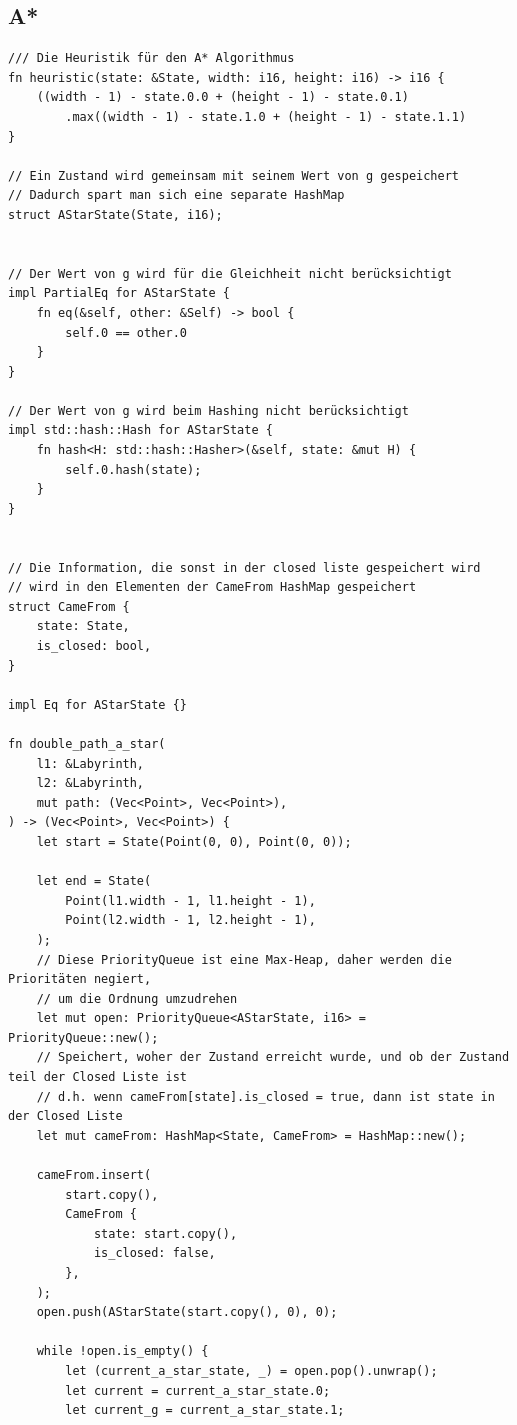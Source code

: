 \documentclass[a4paper,10pt,ngerman]{scrartcl}
\begin{document}
    \subsection{A*}
    \begin{verbatim}
/// Die Heuristik für den A* Algorithmus
fn heuristic(state: &State, width: i16, height: i16) -> i16 {
    ((width - 1) - state.0.0 + (height - 1) - state.0.1)
        .max((width - 1) - state.1.0 + (height - 1) - state.1.1)
}

// Ein Zustand wird gemeinsam mit seinem Wert von g gespeichert
// Dadurch spart man sich eine separate HashMap
struct AStarState(State, i16);


// Der Wert von g wird für die Gleichheit nicht berücksichtigt
impl PartialEq for AStarState {
    fn eq(&self, other: &Self) -> bool {
        self.0 == other.0
    }
}

// Der Wert von g wird beim Hashing nicht berücksichtigt
impl std::hash::Hash for AStarState {
    fn hash<H: std::hash::Hasher>(&self, state: &mut H) {
        self.0.hash(state);
    }
}


// Die Information, die sonst in der closed liste gespeichert wird
// wird in den Elementen der CameFrom HashMap gespeichert
struct CameFrom {
    state: State,
    is_closed: bool,
}

impl Eq for AStarState {}

fn double_path_a_star(
    l1: &Labyrinth,
    l2: &Labyrinth,
    mut path: (Vec<Point>, Vec<Point>),
) -> (Vec<Point>, Vec<Point>) {
    let start = State(Point(0, 0), Point(0, 0));

    let end = State(
        Point(l1.width - 1, l1.height - 1),
        Point(l2.width - 1, l2.height - 1),
    );
    // Diese PriorityQueue ist eine Max-Heap, daher werden die Prioritäten negiert,
    // um die Ordnung umzudrehen
    let mut open: PriorityQueue<AStarState, i16> = PriorityQueue::new();
    // Speichert, woher der Zustand erreicht wurde, und ob der Zustand teil der Closed Liste ist
    // d.h. wenn cameFrom[state].is_closed = true, dann ist state in der Closed Liste
    let mut cameFrom: HashMap<State, CameFrom> = HashMap::new();

    cameFrom.insert(
        start.copy(),
        CameFrom {
            state: start.copy(),
            is_closed: false,
        },
    );
    open.push(AStarState(start.copy(), 0), 0);

    while !open.is_empty() {
        let (current_a_star_state, _) = open.pop().unwrap();
        let current = current_a_star_state.0;
        let current_g = current_a_star_state.1;


\end{verbatim}
\end{document}
